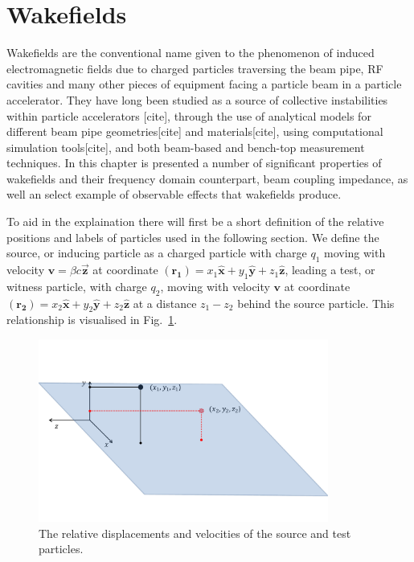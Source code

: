 \section{Wakefields}

Wakefields are the conventional name given to the phenomenon of induced electromagnetic fields due to charged particles traversing the beam pipe, RF cavities and many other pieces of equipment facing a particle beam in a particle accelerator. They have long been studied as a source of collective instabilities within particle accelerators [cite], through the use of analytical models for different beam pipe geometries[cite] and materials[cite], using computational simulation tools[cite], and both beam-based and bench-top measurement techniques. In this chapter is presented a number of significant properties of wakefields and their frequency domain counterpart, beam coupling impedance, as well an select example of observable effects that wakefields produce.

To aid in the explaination there will first be a short definition of the relative positions and labels of particles used in the following section. We define the source, or inducing particle as a charged particle with charge $q_{1}$ moving with velocity $\mathbf{v} = \beta{}c \mathbf{\vec{z}}$ at coordinate $\left( \mathbf{r_{1}} \right) = x_{1}\mathbf{\hat{x}} + y_{1}\mathbf{\hat{y}} + z_{1} \mathbf{\hat{z}}$, leading a test, or witness particle, with charge $q_{2}$, moving with velocity $\mathbf{v}$ at coordinate $\left( \mathbf{r_{2}} \right) = x_{2}\mathbf{\hat{x}} + y_{2}\mathbf{\hat{y}} + z_{2} \mathbf{\hat{z}}$ at a distance $z_{1} - z_{2}$ behind the source particle. This relationship is visualised in Fig.~\ref{fig:source_and_wit}.

\begin{figure}
\begin{center}
\includegraphics[width=0.85\textwidth]{Wakefields_and_Impedances/figures/source-witness-pos.pdf}
\end{center}
\caption{The relative displacements and velocities of the source and test particles.}
\label{fig:source_and_wit}
\end{figure} 

